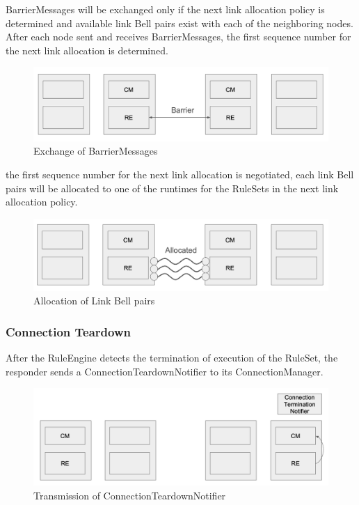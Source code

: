BarrierMessages will be exchanged only if the next link allocation policy is determined and available link Bell pairs exist with each of the neighboring nodes.
After each node sent and receives BarrierMessages, the first sequence number for the next link allocation is determined.
\begin{figure}[H]
  \centerline{\includegraphics[width=\columnwidth]{images/barrier_negotiation.png}}
  \caption{Exchange of BarrierMessages}
\end{figure}

the first sequence number for the next link allocation is negotiated, each link Bell pairs will be allocated to one of the runtimes for the RuleSets in the next link allocation policy.
\begin{figure}[H]
  \centerline{\includegraphics[width=\columnwidth]{images/link_allocation.png}}
  \caption{Allocation of Link Bell pairs}
\end{figure}

\subsubsection{Connection Teardown}

After the RuleEngine detects the termination of execution of the RuleSet, the responder sends a ConnectionTeardownNotifier to its ConnectionManager.
\begin{figure}[H]
  \centerline{\includegraphics[width=\columnwidth]{images/connection_teardown_notifier.png}}
  \caption{Transmission of ConnectionTeardownNotifier}
\end{figure}

